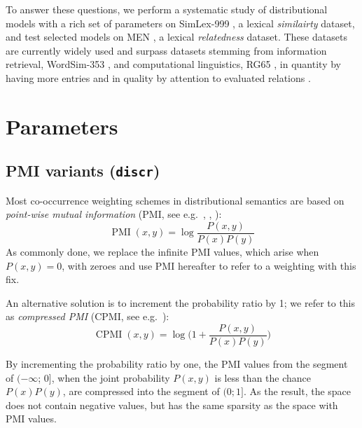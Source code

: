 \documentclass[11pt]{article}
\begin{document}
To answer these questions, we perform a systematic study of distributional models with a rich set of parameters on SimLex-999  \cite{hill2014simlex}, a lexical \emph{similairty} dataset, and test selected models on MEN \cite{Bruni:2014:MDS:2655713.2655714}, a lexical \emph{relatedness} dataset. These datasets are currently widely used and surpass datasets stemming from information retrieval, WordSim-353 \cite{2002:PSC:503104.503110}, and computational linguistics, RG65 \cite{Rubenstein:1965:CCS:365628.365657}, in quantity by having more entries and in quality by attention to evaluated relations \cite{DBLP:journals/corr/MilajevsG16}.

\section{Parameters}
\label{sec:parameters}



\subsection{PMI variants (\texttt{discr})}
\label{sec:pmi-variants}

Most co-occurrence weighting schemes in distributional semantics are based on \emph{point-wise mutual information} (PMI, see e.g.~, , ):
%
\begin{equation}
  \label{eq:pmi}
  \operatorname{PMI}(x, y) = \log\frac{P(x,y)}{P(x)P(y)}
\end{equation}
%
As commonly done, we replace the infinite PMI values,\footnotemark{} which arise when $P(x, y) = 0$, with zeroes and use PMI hereafter to refer to a weighting with this fix.


An alternative solution is to increment the probability ratio by 1; we refer to this as \textit{compressed PMI} (CPMI, see e.g.~):
%
\begin{equation}
  \label{eq:cpmi}
  \operatorname{CPMI}(x, y) = \log\Big( 1 + \frac{P(x,y)}{P(x)P(y)} \Big)
\end{equation}

By incrementing the probability ratio by one, the PMI values from the segment of $(-\infty$; 0], when the joint probability $P(x,y)$ is less than the chance $P(x)P(y)$, are compressed into the segment of $(0; 1]$.
As the result, the space does not contain negative values, but has the same sparsity as the space with PMI values.
\end{document}
